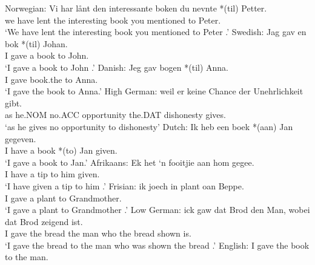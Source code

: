 \begin{exe}
	\ex \label{ex:preprec}
	\begin{xlist}
		\ex Norwegian:\label{ex:nor-tr}
		\gll Vi har lånt den interessante boken du nevnte *(til) Petter.\\
		we have lent the interesting book you mentioned to Peter.\\
		\trans `We have lent the interesting book you mentioned to Peter \citep{Larson.1988}.'
		\ex Swedish:\label{ex:sw-tr}
		\ex \gll Jag gav en bok *(til) Johan.\\
		I gave a book to John.\\
		\trans `I gave a book to John \citep{Holmberg.1995}.'
		\ex Danish:\label{ex:dan-tr}
		\gll Jeg gav bogen *(til) Anna.\\
		I gave book.the to Anna.\\
		\trans `I gave the book to Anna\citep{Holmberg.1998}.'
		\ex High German:\label{ex:hg-tr}
		\gll weil er keine Chance der Unehrlichkeit gibt.\\
		as he.NOM no.ACC opportunity the.DAT dishonesty gives.\\
		\trans `as he gives no opportunity to dishonesty'
		\ex Dutch:\label{ex:dut-tr}
		\gll Ik heb een boek *(aan) Jan gegeven.\\
		I have a book *(to) Jan given.\\
		\trans `I gave a book to Jan.'
		\ex Afrikaans:\label{ex:af-tr}
		\gll Ek het `n fooitjie aan hom gegee.\\
		I have a tip to him given.\\
		\trans `I have given a tip to him \citep{Stadler.1996}.'
		\ex Frisian:\label{ex:fri-tr}
		\gll ik joech in plant oan Beppe.\\
		I gave a plant to Grandmother.\\
		\trans `I gave a plant to Grandmother \citep{Tiersma.1985}.'
		\ex Low German:\label{ex:lg-tr}
		\gll ick gaw dat Brod den Man, wobei dat Brod zeigend ist.\\
		I gave the bread the man who the bread shown is.\\
		\trans `I gave the bread to the man who was shown the bread \citep{Mussaus.1829}.'
		\ex English: I gave the book to the man.\label{ex:en-tr}
	\end{xlist}
\end{exe}

